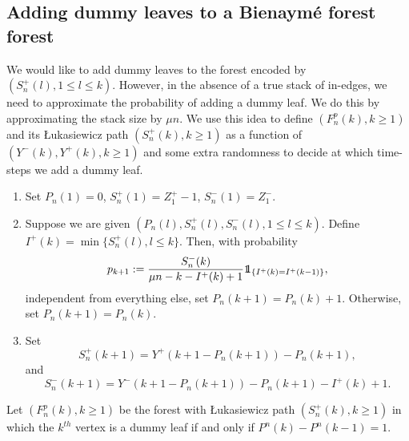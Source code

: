 \subsection{Adding dummy leaves to a Bienaymé forest forest}\label{subsec.purpleleavesGWforest}
We would like to add dummy leaves to the forest encoded by $(S_n^+(l),1\leq l \leq k)$. However, in the absence of a true stack of in-edges, we need to approximate the probability of adding a dummy leaf. We do this by approximating the stack size by $\mu n$. 
We use this idea to define $(F_n^p(k),k\geq 1)$ and its \L ukasiewicz path $(S_n^{+}(k), k\geq 1)$ as a function of $(Y^-(k), Y^+(k) ,k\geq 1)$ and some extra randomness to decide at which time-steps we add a dummy leaf.
\begin{enumerate} 
    \item Set $P_n(1)=0$, $S_n^{+}(1)=Z_1^+-1$, $S_n^{-}(1)=Z_1^-$. 
    \item Suppose we are given $(P_n(l),S_n^{+}(l),S_n^{-}(l), 1\leq l \leq k)$. Define 
    $I^{+}(k)=\min\{S_n^{+}(l), l\leq k\}$. Then, with probability $$p_{k+1}:=\frac{S_n^{-}(k)}{\mu n - k -I^{+}(k)+1}\one_{\{I^{+}(k)=I^{+}(k-1)\}},$$ independent from everything else, set $P_n(k+1)=P_n(k)+1$. Otherwise, set $P_n(k+1)=P_n(k)$. 
    \item Set $$S_n^{+}(k+1)=Y^+(k+1-P_n(k+1))-P_n(k+1),$$ and $$S_n^{-}(k+1)=Y^-(k+1-P_n(k+1))-P_n(k+1)-I^{+}(k)+1.$$
\end{enumerate}
Let $(F^p_n(k),k\geq 1)$ be the forest with \L ukasiewicz path $(S_n^{+}(k), k\geq 1)$ in which the $k^{th}$ vertex is a dummy leaf if and only if $P^n(k)-P^n(k-1)=1$. 
